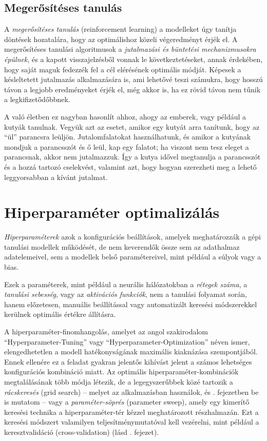 \documentclass[
]{thesis-ekf}
\theoremstyle{definition}
\theoremstyle{remark}
\begin{document}
\subsection{Megerősítéses tanulás}
A \emph{megerősítéses tanulás} (reinforcement learning) a modelleket úgy tanítja döntések hozatalára, hogy az optimálishoz közeli végeredményt érjék el. A megerősítéses tanulási algoritmusok a \emph{jutalmazási és büntetési mechanizmusokra épülnek}, és a kapott visszajelzésből vonnak le következtetéseket, annak érdekében, hogy saját maguk fedezzék fel a cél elérésének optimális módját. Képesek a késleltetett jutalmazás alkalmazására is, ami lehetővé teszi számukra, hogy hosszú távon a legjobb eredményeket érjék el, még akkor is, ha ez rövid távon nem tűnik a legkifizetődőbbnek.\cite{what-is-reinforcement-learning}

A való életben ez nagyban hasonlít ahhoz, ahogy az emberek, vagy például a kutyák tanulnak. Vegyük azt az esetet, amikor egy kutyát arra tanítunk, hogy az ``ül'' parancsra leüljön. Jutalomfalatokat használhatunk, és amikor a kutyának mondjuk a parancsszót és ő leül, kap egy falatot; ha viszont nem tesz eleget a parancsnak, akkor nem jutalmazzuk. Így a kutya idővel megtanulja a parancsszót és a hozzá tartozó cselekvést, valamint azt, hogy hogyan szerezheti meg a lehető leggyorsabban a kívánt jutalmat.

\section{Hiperparaméter optimalizálás}
\label{sec-ml-hiperparameter-optimalizalas}
\emph{Hiperparaméterek} azok a konfigurációs beállítások, amelyek meghatározzák a gépi tanulási modellek működését, de nem keverendők össze sem az adathalmaz adatelemeivel, sem a modellek belső paramétereivel, mint például a súlyok vagy a bias. 

Ezek a paraméterek, mint például a neurális hálózatokban a \emph{rétegek száma}, a \emph{tanulási sebesség}, vagy az \emph{aktivációs funkciók}, nem a tanulási folyamat során, hanem előzetesen, manuális beállítással vagy automatizált keresési módszerekkel kerülnek optimális értékre állításra. 

A hiperparaméter-finomhangolás, amelyet az angol szakirodalom ``Hyperparameter-Tuning'' vagy ``Hyperparameter-Optimization'' néven ismer, elengedhetetlen a modell hatékonyságának maximális kiaknázása szempontjából. Ennek ellenére ez a feladat gyakran jelentős kihívást jelent a számos lehetséges konfigurációs kombináció miatt.
Az optimális hiperparaméter-kombinációk megtalálásának több módja létezik, de a legegyszerűbbek közé tartozik a \emph{rácskeresés} (grid search) -- melyet az alkalmazásban használok, és . fejezetben be is mutatom -- vagy a \emph{paraméter-söprés} (parameter sweep), amely egy kimerítő keresési technika a hiperparaméter-tér kézzel meghatározott részhalmazán. Ezt a keresési módszert valamilyen teljesítménymutatóval kell vezérelni, mint például a keresztvalidáció (cross-validation) (lásd . fejezet).\cite{aws-hyperparameter-tuning,wiki-hyperparameter-optimization}
\end{document}

